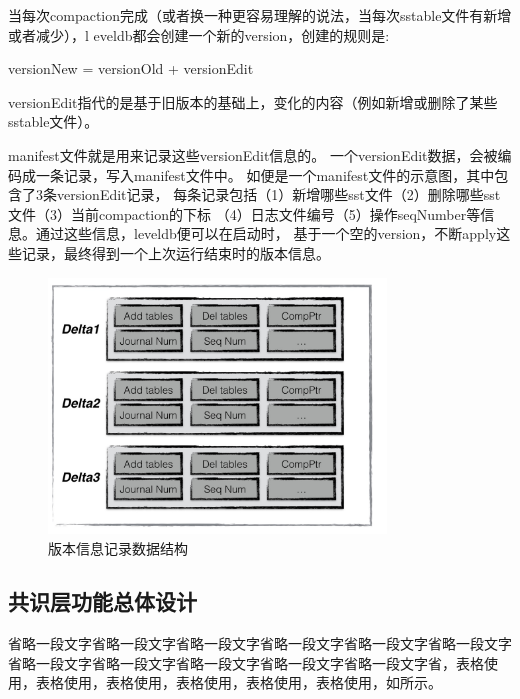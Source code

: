 		当每次compaction完成（或者换一种更容易理解的说法，当每次sstable文件有新增或者减少），l
		eveldb都会创建一个新的version，创建的规则是:

		versionNew = versionOld + versionEdit

		versionEdit指代的是基于旧版本的基础上，变化的内容（例如新增或删除了某些sstable文件）。

		manifest文件就是用来记录这些versionEdit信息的。
		一个versionEdit数据，会被编码成一条记录，写入manifest文件中。
		如便是一个manifest文件的示意图，其中包含了3条versionEdit记录，
		每条记录包括（1）新增哪些sst文件（2）删除哪些sst文件（3）当前compaction的下标
		（4）日志文件编号（5）操作seqNumber等信息。通过这些信息，leveldb便可以在启动时，
		基于一个空的version，不断apply这些记录，最终得到一个上次运行结束时的版本信息。

		\begin{figure}[H]
			\centering
			\includegraphics[width=0.80\textwidth]{images/manifest}
			\caption{版本信息记录数据结构}
			\label{radds_storage_manifest}
		\end{figure}

	\subsection{共识层功能总体设计}

		
		省略一段文字省略一段文字省略一段文字省略一段文字省略一段文字省略一段文字省略一段文字省略一段文字省略一段文字省略一段文字省略一段文字省，表格使用，表格使用，表格使用，表格使用，表格使用，表格使用，如所示。
	
